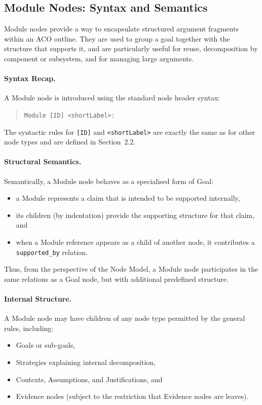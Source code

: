 \documentclass[11pt]{article}
\begin{document}
\subsection{Module Nodes: Syntax and Semantics}
\label{sec:module-semantics}

Module nodes provide a way to encapsulate structured argument fragments within an
ACO outline. They are used to group a goal together with the structure that supports
it, and are particularly useful for reuse, decomposition by component or subsystem,
and for managing large arguments.

\paragraph{Syntax Recap.}
A Module node is introduced using the standard node header syntax:
\begin{quote}
\texttt{Module [ID] \textless shortLabel\textgreater:}
\end{quote}
The syntactic rules for \texttt{[ID]} and \texttt{\textless shortLabel\textgreater{}}
are exactly the same as for other node types and are defined in Section~2.2.

\paragraph{Structural Semantics.}
Semantically, a Module node behaves as a specialised form of Goal:
\begin{itemize}[leftmargin=2em]
  \item a Module represents a claim that is intended to be supported internally,
  \item its children (by indentation) provide the supporting structure for that claim, and
  \item when a Module reference appears as a child of another node, it contributes a
        \texttt{supported\_by} relation.
\end{itemize}

Thus, from the perspective of the Node Model, a Module node participates in the same
relations as a Goal node, but with additional predefined structure.

\paragraph{Internal Structure.}
A Module node may have children of any node type permitted by the general rules,
including:
\begin{itemize}[leftmargin=2em]
  \item Goals or sub-goals,
  \item Strategies explaining internal decomposition,
  \item Contexts, Assumptions, and Justifications, and
  \item Evidence nodes (subject to the restriction that Evidence nodes are leaves).
\end{itemize}
\end{document}
